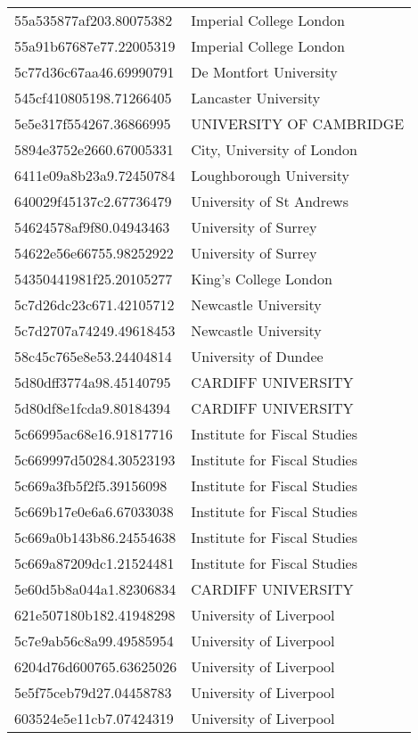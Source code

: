 \begin{tabular}{ll}
55a535877af203.80075382 & Imperial College London \\
55a91b67687e77.22005319 & Imperial College London \\
5c77d36c67aa46.69990791 & De Montfort University \\
545cf410805198.71266405 & Lancaster University \\
5e5e317f554267.36866995 & UNIVERSITY OF CAMBRIDGE \\
5894e3752e2660.67005331 & City, University of London \\
6411e09a8b23a9.72450784 & Loughborough University \\
640029f45137c2.67736479 & University of St Andrews \\
54624578af9f80.04943463 & University of Surrey \\
54622e56e66755.98252922 & University of Surrey \\
54350441981f25.20105277 & King's College London \\
5c7d26dc23c671.42105712 & Newcastle University \\
5c7d2707a74249.49618453 & Newcastle University \\
58c45c765e8e53.24404814 & University of Dundee \\
5d80dff3774a98.45140795 & CARDIFF UNIVERSITY \\
5d80df8e1fcda9.80184394 & CARDIFF UNIVERSITY \\
5c66995ac68e16.91817716 & Institute for Fiscal Studies \\
5c669997d50284.30523193 & Institute for Fiscal Studies \\
5c669a3fb5f2f5.39156098 & Institute for Fiscal Studies \\
5c669b17e0e6a6.67033038 & Institute for Fiscal Studies \\
5c669a0b143b86.24554638 & Institute for Fiscal Studies \\
5c669a87209dc1.21524481 & Institute for Fiscal Studies \\
5e60d5b8a044a1.82306834 & CARDIFF UNIVERSITY \\
621e507180b182.41948298 & University of Liverpool \\
5c7e9ab56c8a99.49585954 & University of Liverpool \\
6204d76d600765.63625026 & University of Liverpool \\
5e5f75ceb79d27.04458783 & University of Liverpool \\
603524e5e11cb7.07424319 & University of Liverpool \\

\end{tabular}
